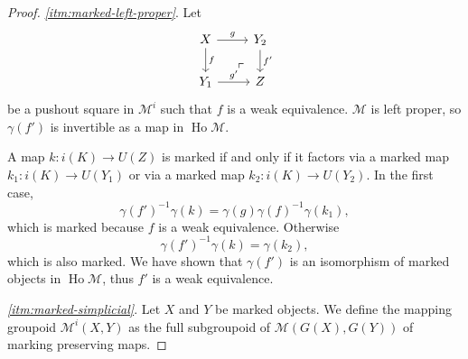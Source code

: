\documentclass[a4paper]{article}
\theoremstyle{remark}
\theoremstyle{definition}
\begin{document}
\begin{proof}
  \emph{\ref{itm:marked-left-proper}}.
  Let 
  \begin{equation}
    \begin{tikzcd}
      X \arrow[r, "g"] \arrow[d, "f"] \arrow[dr, phantom, near end, "\ulcorner"] & Y_2 \arrow[d, "f'"] \\
      Y_1 \arrow[r, "g'"] & Z
    \end{tikzcd}
  \end{equation}
  be a pushout square in $\mathcal{M}^i$ such that $f$ is a weak equivalence.
  $\mathcal{M}$ is left proper, so $\gamma(f')$ is invertible as a map in $\operatorname{Ho} \mathcal{M}$.

  A map $k : i(K) \rightarrow U(Z)$ is marked if and only if it factors via a marked map $k_1 : i(K) \rightarrow U(Y_1)$ or via a marked map $k_2 : i(K) \rightarrow U(Y_2)$.
  In the first case,
  \begin{equation}
    \gamma(f')^{-1} \gamma(k) = \gamma(g) \gamma(f)^{-1} \gamma(k_1),
  \end{equation}
  which is marked because $f$ is a weak equivalence.
  Otherwise
  \begin{equation}
    \gamma(f')^{-1} \gamma(k) = \gamma(k_2),
  \end{equation}
  which is also marked.
  We have shown that $\gamma(f')$ is an isomorphism of marked objects in $\operatorname{Ho} \mathcal{M}$, thus $f'$ is a weak equivalence.

  \emph{\ref{itm:marked-simplicial}}.
  Let $X$ and $Y$ be marked objects.
  We define the mapping groupoid $\mathcal{M}^i(X, Y)$ as the full subgroupoid of $\mathcal{M}(G(X), G(Y))$ of marking preserving maps.


\end{proof}
\end{document}
